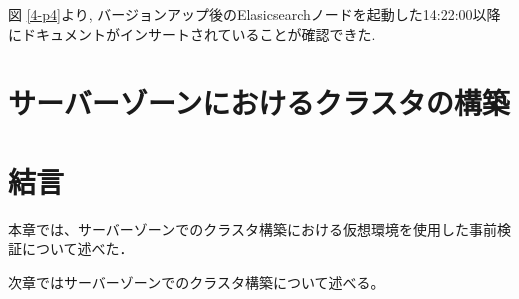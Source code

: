 図 \ref{4-p4}より, バージョンアップ後のElasicsearchノードを起動した14:22:00以降にドキュメントがインサートされていることが確認できた.

\section{サーバーゾーンにおけるクラスタの構築}

\section{結言}
本章では、サーバーゾーンでのクラスタ構築における仮想環境を使用した事前検証について述べた．

次章ではサーバーゾーンでのクラスタ構築について述べる。
